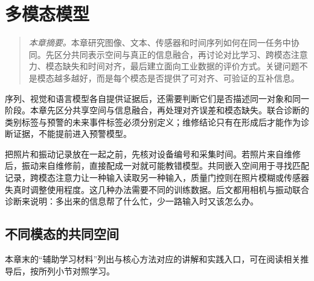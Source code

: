 ﻿\chapter{多模态模型}
\begin{quote}\small
\textit{本章摘要。}本章研究图像、文本、传感器和时间序列如何在同一任务中协同。先区分共同表示空间与真正的信息融合，再讨论对比学习、跨模态注意力、模态缺失和时间对齐，最后建立面向工业数据的评价方式。关键问题不是模态越多越好，而是每个模态是否提供了可对齐、可验证的互补信息。
\end{quote}
序列、视觉和语言模型各自提供证据后，还需要判断它们是否描述同一对象和同一阶段。本章先区分共享空间与信息融合，再处理对齐误差和模态缺失。联合诊断的类别标签与预警的未来事件标签必须分别定义；维修结论只有在形成后才能作为诊断证据，不能提前进入预警模型。

把照片和振动记录放在一起之前，先核对设备编号和采集时间。若照片来自维修后，振动来自维修前，直接配成一对就可能教错模型。共同嵌入空间用于寻找匹配记录，跨模态注意力让一种输入读取另一种输入，质量门控则在照片模糊或传感器失真时调整使用程度。这几种办法需要不同的训练数据。后文都用相机与振动联合诊断来说明：多出来的信息帮了什么忙，少一路输入时又该怎么办。

\section{不同模态的共同空间}

本章末的“辅助学习材料”列出与核心方法对应的讲解和实践入口，可在阅读相关推导后，按所列小节对照学习。

